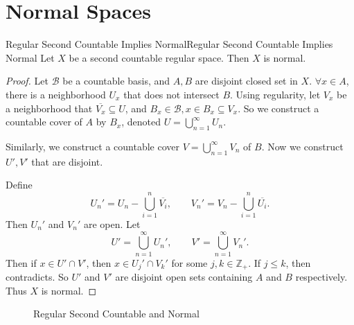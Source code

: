 \documentclass[../main.tex]{subfiles}
\begin{document}
\section{Normal Spaces}
\begin{theorem}{Regular Second Countable Implies Normal}{Regular Second Countable Implies Normal}
Let $X$ be a second countable regular space. Then $X$ is normal.
\end{theorem}
\begin{proof}
Let $\mathcal{B}$ be a countable basis, and $A,B$ are disjoint closed set in $X$. $\forall x\in A$, there is a neighborhood $U_x$ that does not intersect $B$. Using regularity, let $V_x$ be a neighborhood that $\overline{V_x} \subseteq U$, and $B_x\in \mathcal{B}, x\in B_x \subseteq V_x$. So we construct a countable cover of $A$ by $B_x$, denoted $U = \bigcup_{n=1}^{\infty } U_n$.

Similarly, we construct a countable cover $V = \bigcup_{n=1}^{\infty } V_n$ of $B$. Now we construct $U',V'$ that are disjoint.

Define
\begin{equation*}
	U_n' = U_n - \bigcup_{i=1}^{n} \overline{V_i}, \qquad V_n' = V_n - \bigcup_{i=1}^{n} \overline{U_i}.
\end{equation*}
Then $U_n'$ and $V_n'$ are open. Let
\begin{equation*}
	U' = \bigcup_{n=1}^{\infty } U_n', \qquad V' = \bigcup_{n=1}^{\infty } V_n'.
\end{equation*}
Then if $x\in U'\cap V'$, then $x\in U_j'\cap V_k'$ for some $j,k\in \mathbb{Z}_+$. If $j\leq k$, then contradicts. So $U'$ and $V'$ are disjoint open sets containing $A$ and $B$ respectively. Thus $X$ is normal.
\end{proof}

\begin{figure}[ht]
    \centering
    \caption{Regular Second Countable and Normal}
    \label{fig:regular-second-countable-and-normal}
\end{figure}
\end{document}
